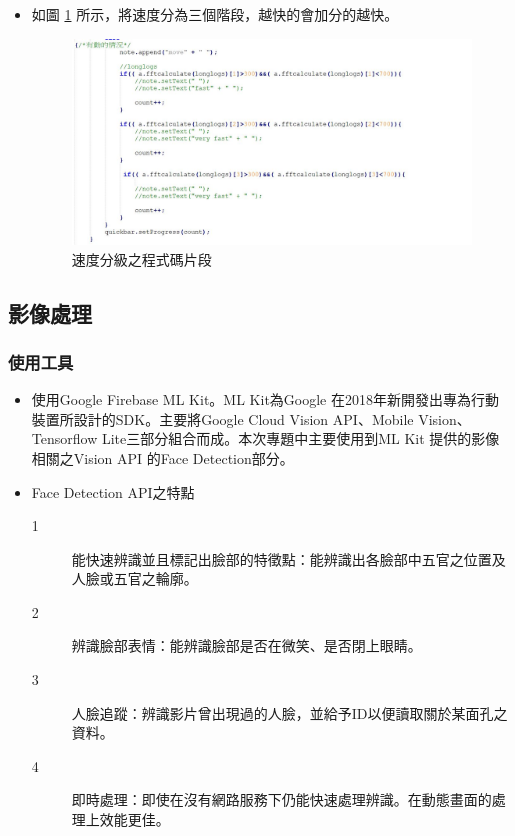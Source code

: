 \documentclass[12pt]{article}  %
\theoremstyle{plain}
\begin{document}
\begin{itemize}
\begin{itemize}
\item 如圖 \ref{速度分級之程式碼片段} 所示，將速度分為三個階段，越快的會加分的越快。
\begin{figure}[htbp]
\centering
\includegraphics[width=15cm]{pic/ch3/code-速度分級.JPG}
\caption{速度分級之程式碼片段} \label{速度分級之程式碼片段}
\end{figure}
\end{itemize}
\end{itemize}
\newpage

\subsection{影像處理}
\subsubsection{使用工具}
\begin{itemize}
\item 使用Google Firebase ML Kit。ML Kit為Google 在2018年新開發出專為行動裝置所設計的SDK。主要將Google Cloud Vision API、Mobile Vision、Tensorflow Lite三部分組合而成。本次專題中主要使用到ML Kit 提供的影像相關之Vision API 的Face Detection部分。
\item Face Detection API之特點
\begin{description}
\item[1] 能快速辨識並且標記出臉部的特徵點：能辨識出各臉部中五官之位置及人臉或五官之輪廓。
\item[2] 辨識臉部表情：能辨識臉部是否在微笑、是否閉上眼睛。
\item[3] 人臉追蹤：辨識影片曾出現過的人臉，並給予ID以便讀取關於某面孔之資料。
\item[4] 即時處理：即使在沒有網路服務下仍能快速處理辨識。在動態畫面的處理上效能更佳。
\end{description}
\end{itemize}
\end{document}
